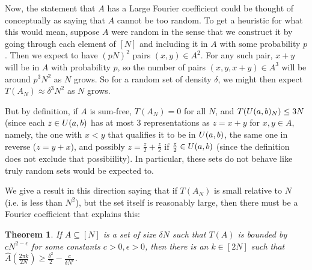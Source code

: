 \documentclass{report}
\newtheorem{theorem}{Theorem}[section]
\theoremstyle{remark}
\numberwithin{equation}{section}
\begin{document}
Now, the statement that $A$ has a Large Fourier coefficient could be
thought of conceptually as saying that $A$ cannot be too random.  To
get a heuristic for what this would mean, suppose $A$ were random in
the sense that we construct it by going through each element of $[N]$
and including it in $A$ with some probability $p$.  Then we expect to
have $(pN)^2$ pairs $(x, y) \in A^2$.  For any such pair, $x+y$ will
be in $A$ with probability $p$, so the number of pairs
$(x, y, x+y) \in A^3$ will be around $p^3 N^2$ as $N$ grows.  So for a
random set of density $\delta$, we might then expect
$T(A_N) \approx \delta^3 N^2$ as $N$ grows.  

But by definition, if $A$ is sum-free, $T(A_N) = 0$ for all $N$, and
$T(U(a,b)_N) \leq 3N$ (since each $z \in U(a,b)$ has at most 3
representations as $z = x+y$ for $x,y \in A$, namely, the one with
$x < y$ that qualifies it to be in $U(a,b)$, the same one in
reverse ($z = y+x$), and possibly $z = \frac{z}{2} + \frac{z}{2}$ if
$\frac{z}{2} \in U(a,b)$ (since the definition does not exclude
that possibiility).  In particular, these sets do not behave like
truly random sets would be expected to.  

We give a result in this direction saying that if $T(A_N)$ is small
relative to $N$ (i.e. is less than $N^2$), but the set itself is
reasonably large, then there must be a Fourier coefficient that
explains this: 

\begin{theorem}\label{thm:alpha_finitary}
  If $A \subseteq [N]$ is a set of size $\delta N$ such that $T(A)$ is
  bounded by $c N^{2-\epsilon}$ for some constants
  $c > 0, \epsilon > 0$, then there is an $k \in [2N]$ such that
  $\widehat{A}(\frac{2\pi k}{2N}) \geq \frac{\delta^2}{2} - \frac{c}{\delta
    N^\epsilon}$.
\end{theorem}
\end{document}
